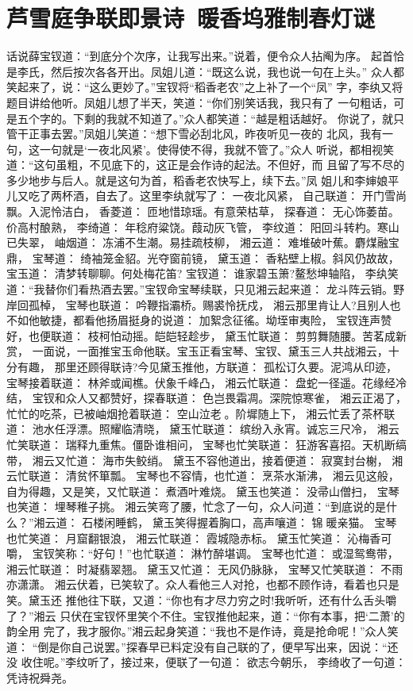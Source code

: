 \chapter{芦雪庭争联即景诗~暖香坞雅制春灯谜}

话说薛宝钗道：“到底分个次序，让我写出来。”说着，便令众人拈阄为序。
起首恰是李氏，然后按次各各开出。凤姐儿道：“既这么说，我也说一句在上头。”
众人都笑起来了，说：“这么更妙了。”宝钗将“稻香老农”之上补了一个“凤”
字，李纨又将题目讲给他听。凤姐儿想了半天，笑道：“你们别笑话我，我只有了
一句粗话，可是五个字的。下剩的我就不知道了。”众人都笑道：“越是粗话越好。
你说了，就只管干正事去罢。”凤姐儿笑道：“想下雪必刮北风，昨夜听见一夜的
北风，我有一句，这一句就是‘一夜北风紧’。使得使不得，我就不管了。”众人
听说，都相视笑道：“这句虽粗，不见底下的，这正是会作诗的起法。不但好，而
且留了写不尽的多少地步与后人。就是这句为首，稻香老农快写上，续下去。”凤
姐儿和李婶娘平儿又吃了两杯酒，自去了。这里李纨就写了：
一夜北风紧，
自己联道：
开门雪尚飘。入泥怜洁白，
香菱道：
匝地惜琼瑶。有意荣枯草，
探春道：
无心饰萎苗。价高村酿熟，
李绮道：
年稔府粱饶。葭动灰飞管，
李纹道：
阳回斗转杓。寒山已失翠，
岫烟道：
冻浦不生潮。易挂疏枝柳，
湘云道：
难堆破叶蕉。麝煤融宝鼎，
宝琴道：
绮袖笼金貂。光夺窗前镜，
黛玉道：
香粘壁上椒。斜风仍故故，
宝玉道：
清梦转聊聊。何处梅花笛?
宝钗道：
谁家碧玉箫?鳌愁坤轴陷，
李纨笑道：“我替你们看热酒去罢。”宝钗命宝琴续联，只见湘云起来道：
龙斗阵云销。野岸回孤棹，
宝琴也联道：
吟鞭指灞桥。赐裘怜抚戍，
湘云那里肯让人?且别人也不如他敏捷，都看他扬眉挺身的说道：
加絮念征徭。坳垤审夷险，
宝钗连声赞好，也便联道：
枝柯怕动摇。皑皑轻趁步，
黛玉忙联道：
剪剪舞随腰。苦茗成新赏，
一面说，一面推宝玉命他联。宝玉正看宝琴、宝钗、黛玉三人共战湘云，十分有趣，
那里还顾得联诗?今见黛玉推他，方联道：
孤松订久要。泥鸿从印迹，
宝琴接着联道：
林斧或闻樵。伏象千峰凸，
湘云忙联道：
盘蛇一径遥。花缘经冷结，
宝钗和众人又都赞好，探春联道：
色岂畏霜凋。深院惊寒雀，
湘云正渴了，忙忙的吃茶，已被岫烟抢着联道：
空山泣老。阶墀随上下，
湘云忙丢了茶杯联道：
池水任浮漂。照耀临清晓，
黛玉忙联道：
缤纷入永宵。诚忘三尺冷，
湘云忙笑联道：
瑞释九重焦。僵卧谁相问，
宝琴也忙笑联道：
狂游客喜招。天机断缟带，
湘云又忙道：
海市失鲛绡。
黛玉不容他道出，接着便道：
寂寞封台榭，
湘云忙联道：
清贫怀箪瓢。
宝琴也不容情，也忙道：
烹茶水渐沸，
湘云见这般，自为得趣，又是笑，又忙联道：
煮酒叶难烧。
黛玉也笑道：
没帚山僧扫，
宝琴也笑道：
埋琴稚子挑。
湘云笑弯了腰，忙念了一句，众人问道：“到底说的是什么？”湘云道：
石楼闲睡鹤，
黛玉笑得握着胸口，高声嚷道：
锦暖亲猫。
宝琴也忙笑道：
月窟翻银浪，
湘云忙联道：
霞城隐赤标。
黛玉忙笑道：
沁梅香可嚼，
宝钗笑称：“好句！”也忙联道：
淋竹醉堪调。
宝琴也忙道：
或湿鸳鸯带，
湘云忙联道：
时凝翡翠翘。
黛玉又忙道：
无风仍脉脉，
宝琴又忙笑联道：
不雨亦潇潇。
湘云伏着，已笑软了。众人看他三人对抢，也都不顾作诗，看着也只是笑。黛玉还
推他往下联，又道：“你也有才尽力穷之时!我听听，还有什么舌头嚼了？”湘云
只伏在宝钗怀里笑个不住。宝钗推他起来，道：“你有本事，把‘二萧’的韵全用
完了，我才服你。”湘云起身笑道：“我也不是作诗，竟是抢命呢！”众人笑道：
“倒是你自己说罢。”探春早已料定没有自己联的了，便早写出来，因说：“还没
收住呢。”李纹听了，接过来，便联了一句道：
欲志今朝乐，
李绮收了一句道：
凭诗祝舜尧。

